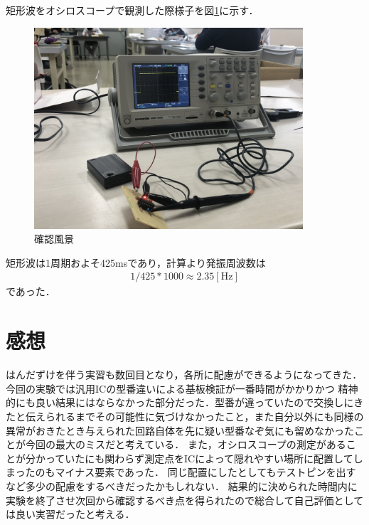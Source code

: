 \documentclass[titlepage]{jarticle}
\begin{document}
矩形波をオシロスコープで観測した際様子を図\ref{fig:確認風景}に示す．
\begin{figure}[H]
    \begin{center}
        \includegraphics[width=10cm]{image/scope.jpg}
        \caption{確認風景}
        \label{fig:確認風景}
    \end{center}
\end{figure}
矩形波は1周期およそ425msであり，計算より発振周波数は
\begin{eqnarray}
    1/425 * 1000 \approx 2.35[\mathrm{Hz}]
\end{eqnarray}
であった．

\section{感想}
はんだずけを伴う実習も数回目となり，各所に配慮ができるようになってきた．今回の実験では汎用ICの型番違いによる基板検証が一番時間がかかりかつ
精神的にも良い結果にはならなかった部分だった．型番が違っていたので交換しにきたと伝えられるまでその可能性に気づけなかったこと，また自分以外にも同様の
異常がおきたとき与えられた回路自体を先に疑い型番なぞ気にも留めなかったことが今回の最大のミスだと考えている．
また，オシロスコープの測定があることが分かっていたにも関わらず測定点をICによって隠れやすい場所に配置してしまったのもマイナス要素であった．
同じ配置にしたとしてもテストピンを出すなど多少の配慮をするべきだったかもしれない．
結果的に決められた時間内に実験を終了させ次回から確認するべき点を得られたので総合して自己評価としては良い実習だったと考える．
\end{document}
